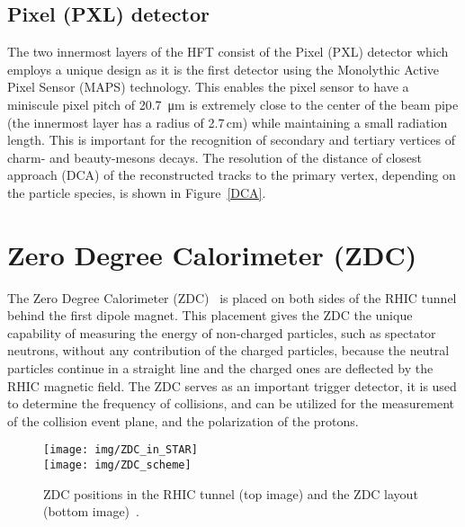 \subsection{Pixel (PXL) detector}
The two innermost layers of the HFT consist of the Pixel (PXL) detector which employs a unique design as it is the
first detector using the Monolythic Active Pixel Sensor (MAPS)
technology. This enables the pixel sensor to have a miniscule pixel pitch of \SI{20.7}{\micro\metre} is extremely close to the center of the beam pipe (the innermost layer has a radius of 2.7$\,$cm) while maintaining
a small radiation length. This is important for the recognition of secondary and tertiary vertices of charm- and beauty-mesons
decays. The resolution of the distance of closest approach (DCA) of the reconstructed 
tracks to the primary vertex, depending on the particle species, is shown in Figure~\ref{DCA}.



\section{Zero Degree Calorimeter (ZDC)\label{ZDCsection}} 


The Zero Degree Calorimeter (ZDC)~\cite{ZDC, ZDCSMD} is placed on both sides of the RHIC tunnel behind the first dipole magnet. This placement gives the ZDC the unique capability of measuring the energy of non-charged particles, such as spectator neutrons, without any contribution of the charged particles, because the neutral particles continue in a straight line and the charged ones are deflected by the RHIC magnetic field. The ZDC serves as an important trigger detector, it is used
to determine the frequency of collisions, and can be utilized for the measurement of the collision event plane, and the polarization of the protons.

\begin{figure}[!htb]
\begin{center}
  \texttt{[image: img/ZDC\_in\_STAR]}\\
  \texttt{[image: img/ZDC\_scheme]}
\end{center}
\caption{\label{ZDC_scheme}ZDC positions in the RHIC tunnel (top image) and the ZDC layout (bottom image)~\cite{ZDCSMD}. }
\end{figure}


